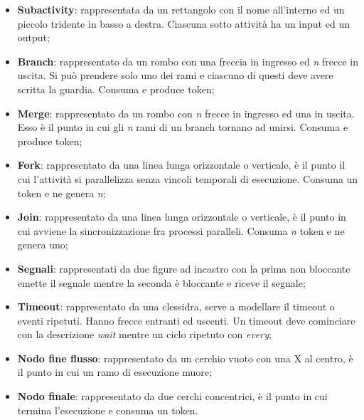 \begin{itemize}
    \item \textbf{Subactivity}: rappresentata da un rettangolo con il nome all'interno ed un piccolo tridente in basso a destra. Ciascuna sotto attività ha un input ed un output;
    \item \textbf{Branch}: rappresentato da un rombo con una freccia in ingresso ed \textit{n} frecce in uscita. Si può prendere solo uno dei rami e ciascuno di questi deve avere scritta la guardia. Consuma e produce token;
    \item \textbf{Merge}: rappresentato da un rombo con \textit{n} frecce in ingresso ed una in uscita. Esso è il punto in cui gli \textit{n} rami di un branch tornano ad unirsi. Consuma e produce token;
    \item \textbf{Fork}: rappresentato da una linea lunga orizzontale o verticale, è il punto il cui l'attività si parallelizza senza vincoli temporali di esecuzione. Consuma un token e ne genera \textit{n};
    \item \textbf{Join}: rappresentato da una linea lunga orizzontale o verticale, è il punto in cui avviene la sincronizzazione fra processi paralleli. Consuma \textit{n} token e ne genera uno;
    \item \textbf{Segnali}: rappresentati da due figure ad incastro con la prima non bloccante emette il segnale mentre la seconda è bloccante e riceve il segnale;
    \item \textbf{Timeout}: rappresentato da una clessidra, serve a modellare il timeout o eventi ripetuti. Hanno frecce entranti ed uscenti. Un timeout deve cominciare con la descrizione \textit{wait} mentre un ciclo ripetuto con \textit{every};
    \item \textbf{Nodo fine flusso}: rappresentato da un cerchio vuoto con una X al centro, è il punto in cui un ramo di esecuzione muore;
    \item \textbf{Nodo finale}: rappresentato da due cerchi concentrici, è il punto in cui termina l'esecuzione e consuma un token.
\end{itemize}
